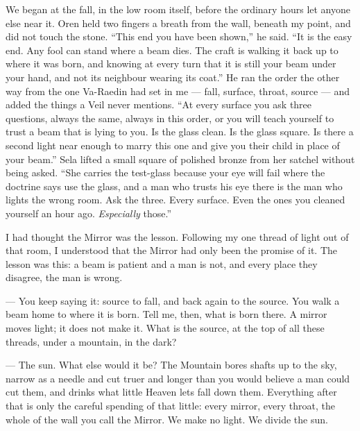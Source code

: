 \noindent We began at the fall, in the low room itself, before the ordinary hours let anyone else near it. Oren held two fingers a breath from the wall, beneath my point, and did not touch the stone. ``This end you have been shown,'' he said. ``It is the easy end. Any fool can stand where a beam dies. The craft is walking it back up to where it was born, and knowing at every turn that it is still your beam under your hand, and not its neighbour wearing its coat.'' He ran the order the other way from the one Va-Raedin had set in me --- fall, surface, throat, source --- and added the things a Veil never mentions. ``At every surface you ask three questions, always the same, always in this order, or you will teach yourself to trust a beam that is lying to you. Is the glass clean. Is the glass square. Is there a second light near enough to marry this one and give you their child in place of your beam.'' Sela lifted a small square of polished bronze from her satchel without being asked. ``She carries the test-glass because your eye will fail where the doctrine says use the glass, and a man who trusts his eye there is the man who lights the wrong room. Ask the three. Every surface. Even the ones you cleaned yourself an hour ago. \textit{Especially} those.''\par

I had thought the Mirror was the lesson. Following my one thread of light out of that room, I understood that the Mirror had only been the promise of it. The lesson was this: a beam is patient and a man is not, and every place they disagree, the man is wrong.\par

\begin{room}

--- You keep saying it: source to fall, and back again to the source. You walk a beam home to where it is born. Tell me, then, what is born there. A mirror moves light; it does not make it. What is the source, at the top of all these threads, under a mountain, in the dark?

--- The sun. What else would it be? The Mountain bores shafts up to the sky, narrow as a needle and cut truer and longer than you would believe a man could cut them, and drinks what little Heaven lets fall down them. Everything after that is only the careful spending of that little: every mirror, every throat, the whole of the wall you call the Mirror. We make no light. We divide the sun.

\end{room}

